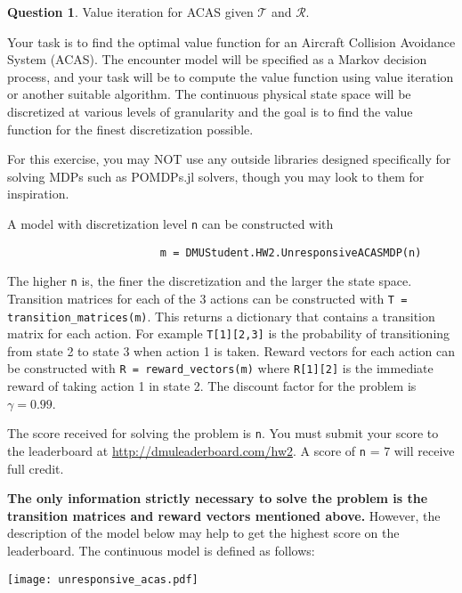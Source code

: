 \documentclass{article}
\theoremstyle{definition}
\newtheorem{question}[thm]{Question}
\begin{document}
\begin{question}
    Value iteration for ACAS given $\mathcal{T}$ and $\mathcal{R}$.

Your task is to find the optimal value function for an Aircraft Collision Avoidance System (ACAS). The encounter model will be specified as a Markov decision process, and your task will be to compute the value function using value iteration or another suitable algorithm. The continuous physical state space will be discretized at various levels of granularity and the goal is to find the value function for the finest discretization possible.

For this exercise, you may NOT use any outside libraries designed specifically for solving MDPs such as POMDPs.jl solvers, though you may look to them for inspiration.

A model with discretization level \texttt{n} can be constructed with
\begin{verbatim}
                        m = DMUStudent.HW2.UnresponsiveACASMDP(n)
\end{verbatim}
The higher \texttt{n} is, the finer the discretization and the larger the state space. Transition matrices for each of the 3 actions can be constructed with \texttt{T = transition\_matrices(m)}. This returns a dictionary that contains a transition matrix for each action. For example \texttt{T[1][2,3]} is the probability of transitioning from state 2 to state 3 when action 1 is taken. Reward vectors for each action can be constructed with \texttt{R = reward\_vectors(m)} where \texttt{R[1][2]} is the immediate reward of taking action 1 in state 2.
The discount factor for the problem is $\gamma = 0.99$.

The score received for solving the problem is \texttt{n}. You must submit your score to the leaderboard at \url{http://dmuleaderboard.com/hw2}. A score of \texttt{n} = 7 will receive full credit.

\vspace{1em}
\noindent\makebox[\linewidth]{\rule{\textwidth}{0.4pt}}
\vspace{1em}

\textbf{The only information strictly necessary to solve the problem is the transition matrices and reward vectors mentioned above.} However, the description of the model below may help to get the highest score on the leaderboard. The continuous model is defined as follows:

\begin{center}
    \texttt{[image: unresponsive\_acas.pdf]}
\end{center}


\end{question}
\end{document}
